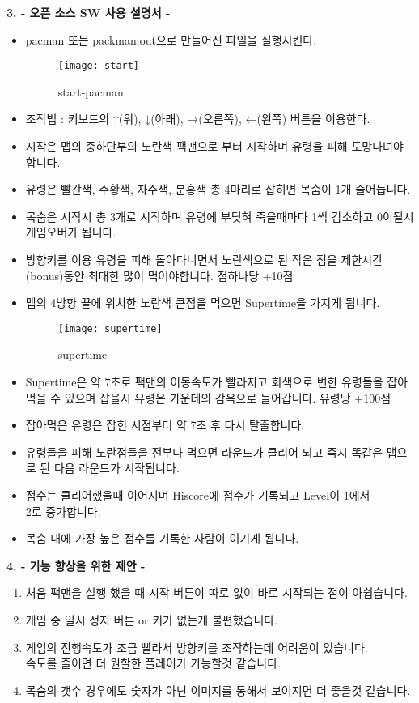 \documentclass{article}
\begin{document}
\newpage
\begin{large}\textbf{3. - 오픈 소스 SW 사용 설명서 -}\end{large}
\begin{itemize}
\item pacman 또는 packman.out으로 만들어진 파일을 실행시킨다.
\begin{figure}[!h]
\centering
\texttt{[image: start]}
\caption{start-pacman}%
\end{figure}
\item 조작법 : 키보드의 ↑(위), ↓(아래), →(오른쪽), ←(왼쪽) 버튼을 이용한다.
\item 시작은 맵의 중하단부의 노란색 팩맨으로 부터 시작하며 유령을 피해 도망다녀야 합니다.
\item 유령은 빨간색, 주황색, 자주색, 분홍색 총 4마리로 잡히면 목숨이 1개 줄어듭니다.
\item 목숨은 시작시 총 3개로 시작하며 유령에 부딪혀 죽을때마다 1씩 감소하고 0이될시 게임오버가 됩니다.
\item 방향키를 이용 유령을 피해 돌아다니면서 노란색으로 된 작은 점을 제한시간(bonus)동안 최대한 많이 먹어야합니다. 점하나당 +10점
\item 맵의 4방향 끝에 위치한 노란색 큰점을 먹으면 Supertime을 가지게 됩니다.
\newpage

\begin{figure}[!h]
\centering
\texttt{[image: supertime]}
\caption{supertime}%
\end{figure}

\item Supertime은 약 7초로 팩맨의 이동속도가 빨라지고 회색으로 변한 유령들을 잡아먹을 수 있으며 잡을시 유령은 가운데의 감옥으로 들어갑니다. 유령당 +100점
\item 잡아먹은 유령은 잡힌 시점부터 약 7초 후 다시 탈출합니다.
\item 유령들을 피해 노란점들을 전부다 먹으면 라운드가 클리어 되고 즉시 똑같은 맵으로 된 다음 라운드가 시작됩니다.
\item 점수는 클리어했을때 이어지며 Hiscore에 점수가 기록되고 Level이 1에서\\ 2로 증가합니다.
\item 목숨 내에 가장 높은 점수를 기록한 사람이 이기게 됩니다.
\end{itemize}

\newpage

\begin{large}\textbf{4. - 기능 향상을 위한 제안 -}\end{large}
\begin{enumerate}
\item 처음 팩맨을 실행 했을 때 시작 버튼이 따로 없이 바로 시작되는 점이 아쉽습니다.
\item 게임 중 일시 정지 버튼 or 키가 없는게 불편했습니다.
\item 게임의 진행속도가 조금 빨라서 방향키를 조작하는데 어려움이 있습니다.\\ 속도를 줄이면 더 원할한 플레이가 가능할것 같습니다.
\item 목숨의 갯수 경우에도 숫자가 아닌 이미지를 통해서 보여지면 더 좋을것 같습니다.
\end{enumerate}
\end{document}
